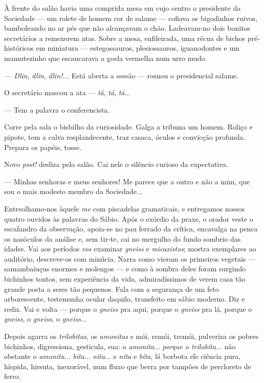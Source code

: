 À frente do salão havia uma comprida mesa em cujo centro o presidente da
Sociedade --- um rolete de homem cor de salame --- cofiava os bigodinhos
ruivos, bamboleando no ar pés que não alcançavam o chão. Ladeavam-no
dois bonitos secretários a remexerem atas. Sobre a mesa, enfileirada,
uma récua de bichos pré-históricos em miniatura --- estegossauros,
plesiossauros, iguanodontes e um mamutezinho que escancarava a goela
vermelha num urro mudo.

\emph{--- Dlin}, \emph{dlin}, \emph{dlin!...} Está aberta a sessão ---
rosnou o presidencial salame.

O secretário mascou a ata --- \emph{tá}, \emph{tá}, \emph{tá}...

--- Tem a palavra o conferencista.

Corre pela sala o bisbilho da curiosidade. Galga a tribuna um homem.
Roliço e pipote, tem a calva resplandecente, traz casaca, óculos e
convicção profunda. Prepara os papéis, tosse.

Novo \emph{psst!} desliza pelo salão. Cai nele o silêncio curioso da
expectativa.

--- Minhas senhoras e meus senhores! Me parece que a outro e não a mim,
que sou o mais modesto membro da Sociedade...

Entreolhamo-nos àquele \emph{me} com piscadelas gramaticais, e
entregamos nossos quatro ouvidos às palavras do Sábio. Após o exórdio da
praxe, o orador veste o escafandro da observação, apoia-se no pau
ferrado da crítica, encavalga na penca os nasóculos da análise e, sem
tir-te, cai no mergulho do fundo sombrio das idades. Vai aos períodos
\emph{eos} examinar \emph{gneiss} e \emph{micaxistos}; mostra exemplares
ao auditório, descreve-os com minúcia. Narra como vieram os primeiros
vegetais --- samambaiuçus enormes e molengos --- e como à sombra deles
foram surgindo bichinhos tontos, sem experiência da vida, admiradíssimos
de verem casa tão grande posta a seres tão pequenos. Fala com a
segurança de um feto arborescente, testemunha ocular daquilo, transfeito
em sábio moderno. Diz e rediz. Vai e volta --- porque o \emph{gneiss}
pra aqui, porque o \emph{gneiss} pra lá, porque o \emph{gneiss}, o
\emph{gneiss}, o \emph{gneiss}...

Depois agarra os \emph{trilobitas}, os \emph{amonitas} e mói, remói,
tremói, pulveriza os pobres bichinhos, digressiona, gesticula, sua: o
\emph{amonita}... \emph{porque o trilobita}... não obstante o
\emph{amonita}... \emph{bita}... \emph{nita}... e \emph{nita} e
\emph{bita}, lá borbota ele ciência pura, híspida, hirsuta, inexorável,
num fluxo que berra por tampões de percloreto de ferro.

